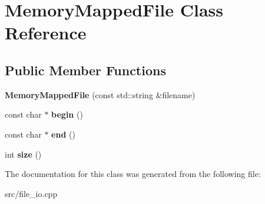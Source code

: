 \hypertarget{classMemoryMappedFile}{}\section{Memory\+Mapped\+File Class Reference}
\label{classMemoryMappedFile}
\subsection*{Public Member Functions}
\begin{DoxyCompactItemize}
\item 
\mbox{\label{classMemoryMappedFile_a5ce10934f39355d75803f5674ce92744}} 
{\bfseries Memory\+Mapped\+File} (const std\+::string \&filename)
\item 
\mbox{\label{classMemoryMappedFile_a21c8639f9f40285173a33253c046ff88}} 
const char $\ast$ {\bfseries begin} ()
\item 
\mbox{\label{classMemoryMappedFile_ac1b88239d2ab5d3d70c09d9bca1493c5}} 
const char $\ast$ {\bfseries end} ()
\item 
\mbox{\label{classMemoryMappedFile_adb5dd54a4c6770722d2387775637a52c}} 
int {\bfseries size} ()
\end{DoxyCompactItemize}


The documentation for this class was generated from the following file\+:\begin{DoxyCompactItemize}
\item 
src/file\+\_\+io.\+cpp\end{DoxyCompactItemize}
